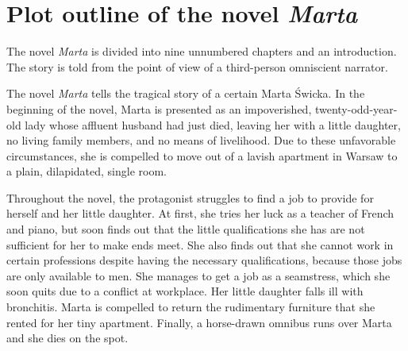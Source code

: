 \section{Plot outline of the novel \textit{Marta}}
The novel \textit{Marta} is divided into nine unnumbered chapters and an introduction. 
The story is told from the point of view of a third-person omniscient narrator.

The novel \textit{Marta} tells the tragical story of a certain Marta Świcka.
In the beginning of the novel, Marta is presented as an impoverished, twenty-odd-year-old lady whose affluent husband had just died, leaving her with a little daughter, no living family members, and no means of livelihood.
Due to these unfavorable circumstances, she is compelled to move out of a lavish apartment in Warsaw to a plain, dilapidated, single room.

Throughout the novel, the protagonist struggles to find a job to provide for herself and her little daughter.
At first, she tries her luck as a teacher of French and piano, but soon finds out that the little qualifications she has are not sufficient for her to make ends meet.
She also finds out that she cannot work in certain professions despite having the necessary qualifications, because those jobs are only available to men.
She manages to get a job as a seamstress, which she soon quits due to a conflict at workplace.
Her little daughter falls ill with bronchitis.
Marta is compelled to return the rudimentary furniture that she rented for her tiny apartment.
Finally, a horse-drawn omnibus runs over Marta and she dies on the spot.
